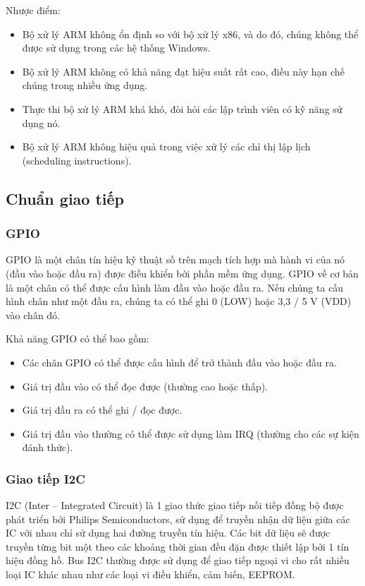 \documentclass{article} %
\begin{document}
	Nhược điểm:
	
	\begin{itemize}
		\item Bộ xử lý ARM không ổn định so với bộ xử lý x86, và do đó, chúng không thể được sử dụng trong các hệ thống Windows.
		\item Bộ xử lý ARM không có khả năng đạt hiệu suất rất cao, điều này hạn chế chúng trong nhiều ứng dụng.
		\item Thực thi bộ xử lý ARM khá khó, đòi hỏi các lập trình viên có kỹ năng sử dụng nó.
		\item Bộ xử lý ARM không hiệu quả trong việc xử lý các chỉ thị lập lịch (scheduling instructions).
	\end{itemize}
	

	
	\subsection{Chuẩn giao tiếp}
	
	\subsubsection{GPIO}
	
	GPIO là một chân tín hiệu kỹ thuật số trên mạch tích hợp mà hành vi của nó (đầu vào hoặc đầu ra) được điều khiển bởi phần mềm ứng dụng. GPIO về cơ bản là một chân có thể được cấu hình làm đầu vào hoặc đầu ra. Nếu chúng ta cấu hình chân như một đầu ra, chúng ta có thể ghi 0 (LOW) hoặc 3,3 / 5 V (VDD) vào chân đó. 
	
	Khả năng GPIO có thể bao gồm\cite{GPIO}:
	\begin{itemize}
		\item Các chân GPIO có thể được cấu hình để trở thành đầu vào hoặc đầu ra.
		\item Giá trị đầu vào có thể đọc được (thường cao hoặc thấp).
		\item Giá trị đầu ra có thể ghi / đọc được.
		\item Giá trị đầu vào thường có thể được sử dụng làm IRQ (thường cho các sự kiện đánh thức).
	\end{itemize}	
	
	\subsubsection{Giao tiếp I2C}
	I2C (Inter – Integrated Circuit) là 1 giao thức giao tiếp nối tiếp đồng bộ được phát triển bởi Philips Semiconductors, sử dụng để truyền nhận dữ liệu giữa các IC với nhau chỉ sử dụng hai đường truyền tín hiệu.	
	Các bit dữ liệu sẽ được truyền từng bit một theo các khoảng thời gian đều đặn được thiết lập bởi 1 tín hiệu đồng hồ. Bus I2C thường được sử dụng để giao tiếp ngoại vi cho rất nhiều loại IC khác nhau như các loại vi điều khiển, cảm biến, EEPROM.
	
\end{document}
